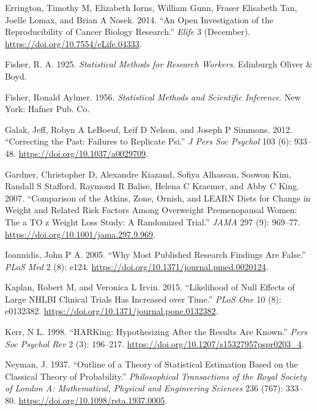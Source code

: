 \documentclass[
  12pt,
]{book}
\newlength{\cslhangindent}
\newlength{\cslentryspacingunit} %
\newenvironment{CSLReferences}[2] %
 {%
  \setlength{\parindent}{0pt}
  \ifodd #1
  \let\oldpar\par
  \def\par{\hangindent=\cslhangindent\oldpar}
  \fi
  \setlength{\parskip}{#2\cslentryspacingunit}
 }%
 {}
\begin{document}
\begin{CSLReferences}{1}{0}
\leavevmode{}%
Errington, Timothy M, Elizabeth Iorns, William Gunn, Fraser Elisabeth Tan, Joelle Lomax, and Brian A Nosek. 2014. {``An Open Investigation of the Reproducibility of Cancer Biology Research.''} \emph{Elife} 3 (December). \url{https://doi.org/10.7554/eLife.04333}.

\leavevmode{}%
Fisher, R. A. 1925. \emph{Statistical Methods for Research Workers}. Edinburgh Oliver \& Boyd.

\leavevmode{}%
Fisher, Ronald Aylmer. 1956. \emph{Statistical Methods and Scientific Inference}. New York: Hafner Pub. Co.

\leavevmode{}%
Galak, Jeff, Robyn A LeBoeuf, Leif D Nelson, and Joseph P Simmons. 2012. {``Correcting the Past: Failures to Replicate Psi.''} \emph{J Pers Soc Psychol} 103 (6): 933--48. \url{https://doi.org/10.1037/a0029709}.

\leavevmode{}%
Gardner, Christopher D, Alexandre Kiazand, Sofiya Alhassan, Soowon Kim, Randall S Stafford, Raymond R Balise, Helena C Kraemer, and Abby C King. 2007. {``Comparison of the Atkins, Zone, Ornish, and LEARN Diets for Change in Weight and Related Risk Factors Among Overweight Premenopausal Women: The a TO z Weight Loss Study: A Randomized Trial.''} \emph{JAMA} 297 (9): 969--77. \url{https://doi.org/10.1001/jama.297.9.969}.

\leavevmode{}%
Ioannidis, John P A. 2005. {``Why Most Published Research Findings Are False.''} \emph{PLoS Med} 2 (8): e124. \url{https://doi.org/10.1371/journal.pmed.0020124}.

\leavevmode{}%
Kaplan, Robert M, and Veronica L Irvin. 2015. {``Likelihood of Null Effects of Large NHLBI Clinical Trials Has Increased over Time.''} \emph{PLoS One} 10 (8): e0132382. \url{https://doi.org/10.1371/journal.pone.0132382}.

\leavevmode{}%
Kerr, N L. 1998. {``HARKing: Hypothesizing After the Results Are Known.''} \emph{Pers Soc Psychol Rev} 2 (3): 196--217. \url{https://doi.org/10.1207/s15327957pspr0203_4}.

\leavevmode{}%
Neyman, J. 1937. {``Outline of a Theory of Statistical Estimation Based on the Classical Theory of Probability.''} \emph{Philosophical Transactions of the Royal Society of London A: Mathematical, Physical and Engineering Sciences} 236 (767): 333--80. \url{https://doi.org/10.1098/rsta.1937.0005}.


\end{CSLReferences}
\end{document}
